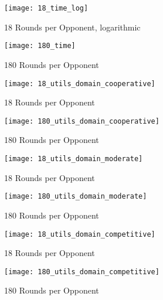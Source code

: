 \begin{figure}[!htb]
	\texttt{[image: 18\_time\_log]}
	\caption{18 Rounds per Opponent, logarithmic}
	\label{fig:18_time}
	\endminipage\hfill
	\texttt{[image: 180\_time]}
	\caption{180 Rounds per Opponent}
	\label{fig:180_time}
	\endminipage\hfill
\end{figure}



\begin{figure}[!htb]
	\texttt{[image: 18\_utils\_domain\_cooperative]}
	\caption{18 Rounds per Opponent}
	\label{fig:18_utilscoop}
	\endminipage\hfill
	\texttt{[image: 180\_utils\_domain\_cooperative]}
	\caption{180 Rounds per Opponent}
	\label{fig:180_utilscoop}
	\endminipage\hfill
\end{figure}


\begin{figure}[!htb]
	\texttt{[image: 18\_utils\_domain\_moderate]}
	\caption{18 Rounds per Opponent}
	\label{fig:18_utilsmod}
	\endminipage\hfill
	\texttt{[image: 180\_utils\_domain\_moderate]}
	\caption{180 Rounds per Opponent}
	\label{fig:180_utilsmod}
	\endminipage\hfill
\end{figure}


\begin{figure}[!htb]
	\texttt{[image: 18\_utils\_domain\_competitive]}
	\caption{18 Rounds per Opponent}
	\label{fig:18_utilscomp}
	\endminipage\hfill
	\texttt{[image: 180\_utils\_domain\_competitive]}
	\caption{180 Rounds per Opponent}
	\label{fig:180_utilscomp}
	\endminipage\hfill
\end{figure}












